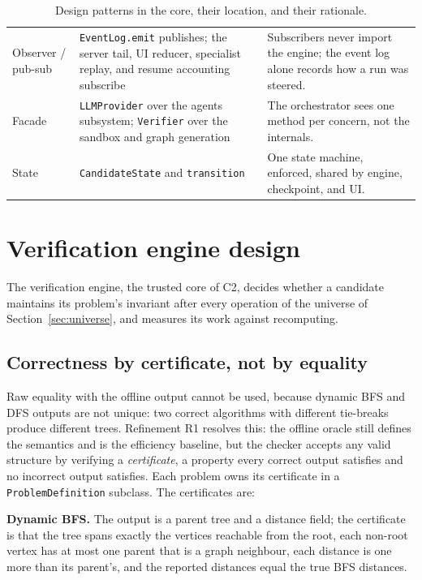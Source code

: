 \begin{table}[H]
\begin{tabular}{@{}p{}p{}p{}@{}}
  Observer / pub-sub & \texttt{EventLog.emit} publishes; the server tail, UI reducer, specialist replay, and resume accounting subscribe & Subscribers never import the engine; the event log alone records how a run was steered. \\
  Facade & \texttt{LLMProvider} over the agents subsystem; \texttt{Verifier} over the sandbox and graph generation & The orchestrator sees one method per concern, not the internals. \\
  State & \texttt{CandidateState} and \texttt{transition} & One state machine, enforced, shared by engine, checkpoint, and UI. \\
  \bottomrule
  \end{tabular}
  \caption{Design patterns in the core, their location, and their rationale.}
  \label{tab:patterns}
\end{table}

\section{Verification engine design}
\label{sec:design-verifier}

The verification engine, the trusted core of C2, decides whether a candidate
maintains its problem's invariant after every operation of the universe of
Section~\ref{sec:universe}, and measures its work against recomputing.

\subsection{Correctness by certificate, not by equality}

Raw equality with the offline output cannot be used, because dynamic BFS and DFS
outputs are not unique: two correct algorithms with different tie-breaks produce
different trees. Refinement R1 resolves this: the offline oracle still defines
the semantics and is the efficiency baseline, but the checker accepts any valid
structure by verifying a \emph{certificate}, a property every correct output
satisfies and no incorrect output satisfies. Each problem owns its certificate
in a \texttt{ProblemDefinition} subclass. The certificates are:


\textbf{Dynamic BFS.} The output is a parent tree and a distance field; the
certificate is that the tree spans exactly the vertices reachable from the root,
each non-root vertex has at most one parent that is a graph neighbour, each
distance is one more than its parent's, and the reported distances equal the true
BFS distances.


